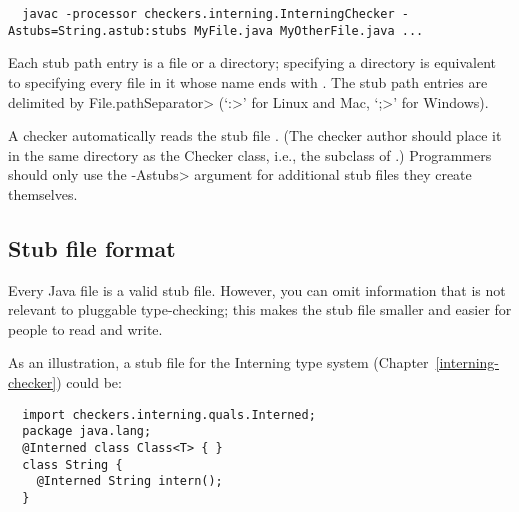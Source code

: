 \begin{smaller}
\begin{Verbatim}
  javac -processor checkers.interning.InterningChecker -Astubs=String.astub:stubs MyFile.java MyOtherFile.java ...
\end{Verbatim}
\end{smaller}

Each stub path entry is a file or a directory; specifying a directory is
equivalent to specifying every file in it whose name ends with
.  The stub path entries are delimited by
\<File.pathSeparator> (`\<:>' for Linux and Mac, `\<;>' for Windows).

A checker automatically reads the stub file .  (The checker
author should place it in the same directory as the Checker class, i.e.,
the subclass of .)  Programmers should only use the
\<-Astubs> argument for additional stub files they create themselves.




\subsection{Stub file format\label{stub-format}}

Every Java file is a valid stub file.  However, you can omit information
that is not relevant to pluggable type-checking; this makes the stub file
smaller and easier for people to read and write.

As an illustration, a stub file for the Interning type system
(Chapter~\ref{interning-checker}) could be:

\begin{Verbatim}
  import checkers.interning.quals.Interned;
  package java.lang;
  @Interned class Class<T> { }
  class String {
    @Interned String intern();
  }
\end{Verbatim}





